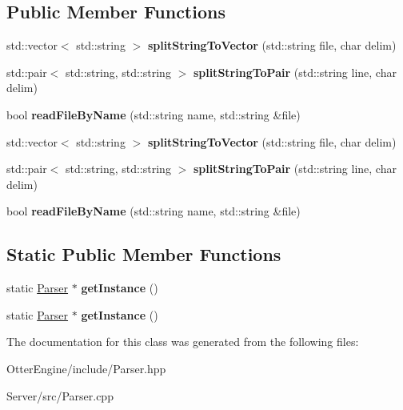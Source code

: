 \subsection*{Public Member Functions}
\begin{DoxyCompactItemize}
\item 
std\+::vector$<$ std\+::string $>$ {\bfseries split\+String\+To\+Vector} (std\+::string file, char delim)\hypertarget{class_parser_aa77bc13184cdd428b4fa017c38b5011e}{}\label{class_parser_aa77bc13184cdd428b4fa017c38b5011e}

\item 
std\+::pair$<$ std\+::string, std\+::string $>$ {\bfseries split\+String\+To\+Pair} (std\+::string line, char delim)\hypertarget{class_parser_af45c7d99391e3d8473fd9bf80ba4dc98}{}\label{class_parser_af45c7d99391e3d8473fd9bf80ba4dc98}

\item 
bool {\bfseries read\+File\+By\+Name} (std\+::string name, std\+::string \&file)\hypertarget{class_parser_ad1a1c99f1cc2ac758c285841106fd524}{}\label{class_parser_ad1a1c99f1cc2ac758c285841106fd524}

\item 
std\+::vector$<$ std\+::string $>$ {\bfseries split\+String\+To\+Vector} (std\+::string file, char delim)\hypertarget{class_parser_ac41c7f45cf0df0b3d8898aecce46872e}{}\label{class_parser_ac41c7f45cf0df0b3d8898aecce46872e}

\item 
std\+::pair$<$ std\+::string, std\+::string $>$ {\bfseries split\+String\+To\+Pair} (std\+::string line, char delim)\hypertarget{class_parser_a262d5645242eaa15336c96460ad5bdab}{}\label{class_parser_a262d5645242eaa15336c96460ad5bdab}

\item 
bool {\bfseries read\+File\+By\+Name} (std\+::string name, std\+::string \&file)\hypertarget{class_parser_ad1a1c99f1cc2ac758c285841106fd524}{}\label{class_parser_ad1a1c99f1cc2ac758c285841106fd524}

\end{DoxyCompactItemize}
\subsection*{Static Public Member Functions}
\begin{DoxyCompactItemize}
\item 
static \hyperlink{class_parser}{Parser} $\ast$ {\bfseries get\+Instance} ()\hypertarget{class_parser_abb5df55ae7ef34532d0d9e7686bccbbf}{}\label{class_parser_abb5df55ae7ef34532d0d9e7686bccbbf}

\item 
static \hyperlink{class_parser}{Parser} $\ast$ {\bfseries get\+Instance} ()\hypertarget{class_parser_abb5df55ae7ef34532d0d9e7686bccbbf}{}\label{class_parser_abb5df55ae7ef34532d0d9e7686bccbbf}

\end{DoxyCompactItemize}


The documentation for this class was generated from the following files\+:\begin{DoxyCompactItemize}
\item 
Otter\+Engine/include/Parser.\+hpp\item 
Server/src/Parser.\+cpp\end{DoxyCompactItemize}

